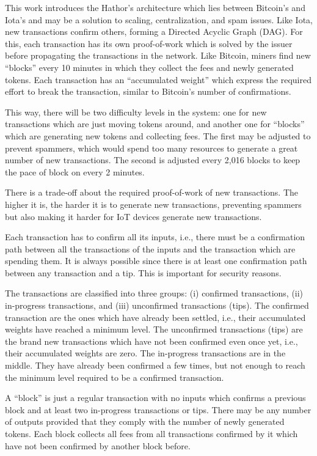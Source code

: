 
This work introduces the Hathor's architecture which lies between Bitcoin's and Iota's and may be a solution to scaling, centralization, and spam issues. Like Iota, new transactions confirm others, forming a Directed Acyclic Graph (DAG). For this, each transaction has its own proof-of-work which is solved by the issuer before propagating the transactions in the network. Like Bitcoin, miners find new ``blocks'' every 10 minutes in which they collect the fees and newly generated tokens. Each transaction has an ``accumulated weight'' which express the required effort to break the transaction, similar to Bitcoin's number of confirmations.

This way, there will be two difficulty levels in the system: one for new transactions which are just moving tokens around, and another one for ``blocks'' which are generating new tokens and collecting fees. The first may be adjusted to prevent spammers, which would spend too many resources to generate a great number of new transactions. The second is adjusted every 2,016 blocks to keep the pace of block on every 2 minutes.

There is a trade-off about the required proof-of-work of new transactions. The higher it is, the harder it is to generate new transactions, preventing spammers but also making it harder for IoT devices generate new transactions.

Each transaction has to confirm all its inputs, i.e., there must be a confirmation path between all the transactions of the inputs and the transaction which are spending them. It is always possible since there is at least one confirmation path between any transaction and a tip. This is important for security reasons.

The transactions are classified into three groups: (i) confirmed transactions, (ii) in-progress transactions, and (iii) unconfirmed transactions (tips). The confirmed transaction are the ones which have already been settled, i.e., their accumulated weights have reached a minimum level. The unconfirmed transactions (tips) are the brand new transactions which have not been confirmed even once yet, i.e., their accumulated weights are zero. The in-progress transactions are in the middle. They have already been confirmed a few times, but not enough to reach the minimum level required to be a confirmed transaction.

A ``block'' is just a regular transaction with no inputs which confirms a previous block and at least two in-progress transactions or tips. There may be any number of outputs provided that they comply with the number of newly generated tokens. Each block collects all fees from all transactions confirmed by it which have not been confirmed by another block before.

